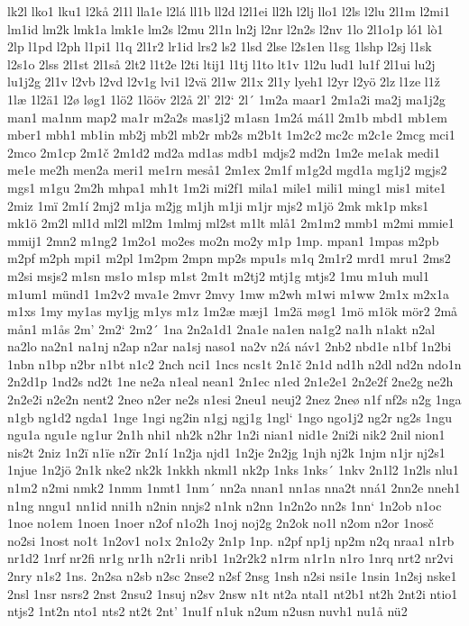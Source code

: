 lk2l
lko1
lku1
l2kå
2l1l
lla1e
l2lá
ll1b
ll2d
l2l1ei
ll2h
l2lj
llo1
l2ls
l2lu
2l1m
l2mi1
lm1id
lm2k
lmk1a
lmk1e
lm2s
l2mu
2l1n
ln2j
l2nr
l2n2s
l2nv
1lo
2l1o1p
ló1
lò1
2lp
l1pd
l2ph
l1pi1
l1q
2l1r2
lr1id
lrs2
ls2
1lsd
2lse
l2s1en
l1sg
1lshp
l2sj
l1sk
l2s1o
2lss
2l1st
2l1så
2lt2
l1t2e
l2ti
ltij1
l1tj
l1to
lt1v
1l2u
lud1
lu1f
2l1ui
lu2j
lu1j2g
2l1v
l2vb
l2vd
l2v1g
lvi1
l2vä
2l1w
2l1x
2l1y
lyeh1
l2yr
l2yö
2lz
l1ze
l1ž
1læ
1l2ä1
l2ø
løg1
1lö2
1lööv
2l2å
2l'
2l2`
2l´
1m2a
maar1
2m1a2i
ma2j
ma1j2g
man1
ma1nm
map2
ma1r
m2a2s
mas1j2
m1asn
1m2á
má1l
2m1b
mbd1
mb1em
mber1
mbh1
mb1in
mb2j
mb2l
mb2r
mb2s
m2b1t
1m2c2
mc2c
m2c1e
2mcg
mci1
2mco
2m1cp
2m1č
2m1d2
md2a
md1as
mdb1
mdjs2
md2n
1m2e
me1ak
medi1
me1e
me2h
men2a
meri1
me1rn
meså1
2m1ex
2m1f
m1g2d
mgd1a
mg1j2
mgjs2
mgs1
m1gu
2m2h
mhpa1
mh1t
1m2i
mi2f1
mila1
mile1
mili1
ming1
mis1
mite1
2miz
1mï
2m1í
2mj2
m1ja
m2jg
m1jh
m1ji
m1jr
mjs2
m1jö
2mk
mk1p
mks1
mk1ö
2m2l
ml1d
ml2l
ml2m
1mlmj
ml2st
m1lt
mlå1
2m1m2
mmb1
m2mi
mmie1
mmij1
2mn2
m1ng2
1m2o1
mo2es
mo2n
mo2y
m1p
1mp.
mpan1
1mpas
m2pb
m2pf
m2ph
mpi1
m2pl
1m2pm
2mpn
mp2s
mpu1s
m1q
2m1r2
mrd1
mru1
2ms2
m2si
msjs2
m1sn
ms1o
m1sp
m1st
2m1t
m2tj2
mtj1g
mtjs2
1mu
m1uh
mul1
m1um1
münd1
1m2v2
mva1e
2mvr
2mvy
1mw
m2wh
m1wi
m1ww
2m1x
m2x1a
m1xs
1my
my1as
my1jg
m1ys
m1z
1m2æ
mæj1
1m2ä
møg1
1mö
m1ök
mör2
2må
mån1
m1ås
2m'
2m2`
2m2´
1na
2n2a1d1
2na1e
na1en
na1g2
na1h
n1akt
n2al
na2lo
na2n1
na1nj
n2ap
n2ar
na1sj
naso1
na2v
n2á
náv1
2nb2
nbd1e
n1bf
1n2bi
1nbn
n1bp
n2br
n1bt
n1c2
2nch
nci1
1ncs
ncs1t
2n1č
2n1d
nd1h
n2dl
nd2n
ndo1n
2n2d1p
1nd2s
nd2t
1ne
ne2a
n1eal
nean1
2n1ec
n1ed
2n1e2e1
2n2e2f
2ne2g
ne2h
2n2e2i
n2e2n
nent2
2neo
n2er
ne2s
n1esi
2neu1
neuj2
2nez
2neø
n1f
nf2s
n2g
1nga
n1gb
ng1d2
ngda1
1nge
1ngi
ng2in
n1gj
ngj1g
1ngl`
1ngo
ngo1j2
ng2r
ng2s
1ngu
ngu1a
ngu1e
ng1ur
2n1h
nhi1
nh2k
n2hr
1n2i
nian1
nid1e
2ni2i
nik2
2nil
nion1
nis2t
2niz
1n2ï
n1ïe
n2ïr
2n1í
1n2ja
njd1
1n2je
2n2jg
1njh
nj2k
1njm
n1jr
nj2s1
1njue
1n2jö
2n1k
nke2
nk2k
1nkkh
nkml1
nk2p
1nks
1nks´
1nkv
2n1l2
1n2ls
nlu1
n1m2
n2mi
nmk2
1nmm
1nmt1
1nm´
nn2a
nnan1
nn1as
nna2t
nná1
2nn2e
nneh1
n1ng
nngu1
nn1id
nni1h
n2nin
nnjs2
n1nk
n2nn
1n2n2o
nn2s
1nn`
1n2ob
n1oc
1noe
no1em
1noen
1noer
n2of
n1o2h
1noj
noj2g
2n2ok
no1l
n2om
n2or
1nosč
no2si
1nost
no1t
1n2ov1
no1x
2n1o2y
2n1p
1np.
n2pf
np1j
np2m
n2q
nraa1
n1rb
nr1d2
1nrf
nr2fi
nr1g
nr1h
n2r1i
nrib1
1n2r2k2
n1rm
n1r1n
n1ro
1nrq
nrt2
nr2vi
2nry
n1s2
1ns.
2n2sa
n2sb
n2sc
2nse2
n2sf
2nsg
1nsh
n2si
nsi1e
1nsin
1n2sj
nske1
2nsl
1nsr
nsrs2
2nst
2nsu2
1nsuj
n2sv
2nsw
n1t
nt2a
ntal1
nt2b1
nt2h
2nt2i
ntio1
ntjs2
1nt2n
nto1
nts2
nt2t
2nt'
1nu1f
n1uk
n2um
n2usn
nuvh1
nu1å
nü2
